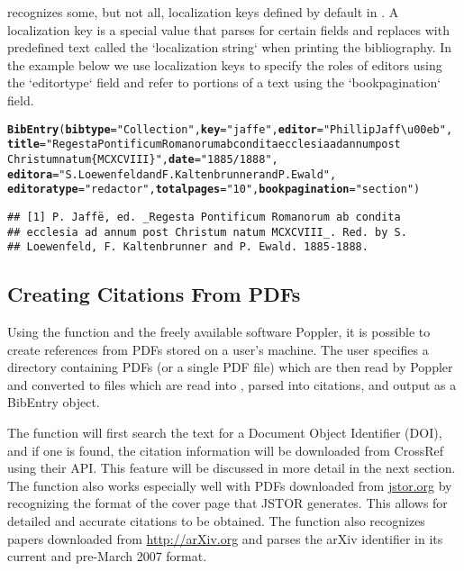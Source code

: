\documentclass[article]{jss}\usepackage[]{graphicx}\usepackage[]{color}
\makeatletter
\newcommand{\hlstr}[1]{\textcolor[rgb]{0.125,0.125,1}{#1}}%
\newcommand{\hlstd}[1]{\textcolor[rgb]{0.251,0.251,0.282}{#1}}%
\newcommand{\hlkwc}[1]{\textcolor[rgb]{0.529,0,0.184}{\textbf{#1}}}%
\newcommand{\hlkwd}[1]{\textcolor[rgb]{0.251,0.251,0.282}{\textbf{#1}}}%
\newenvironment{kframe}{%
 \def\at@end@of@kframe{}%
 \ifinner\ifhmode%
  \def\at@end@of@kframe{\end{minipage}}%
  \begin{minipage}{\columnwidth}%
 \fi\fi%
 \def\FrameCommand##1{\hskip\@totalleftmargin \hskip-\fboxsep
 \colorbox{shadecolor}{##1}\hskip-\fboxsep
     \hskip-\linewidth \hskip-\@totalleftmargin \hskip\columnwidth}%
 \MakeFramed {\advance\hsize-\width
   \@totalleftmargin\z@ \linewidth\hsize
   \@setminipage}}%
 {\par\unskip\endMakeFramed%
 \at@end@of@kframe}
\newenvironment{knitrout}{}{} %
\newcommand{\ourpkg}{\pkg{RefManageR}}
\makeatother
\begin{document}
\ourpkg{} recognizes some, but not all, localization keys defined by default in \Biblatex{}.  A localization key is a special value that \Biblatex{} parses for certain fields and replaces with predefined text called the `localization string` when printing the bibliography.  In the example below we use localization keys to specify the roles of editors using the `editortype` field and refer to portions of a text using the `bookpagination` field.
\begin{knitrout}
\color{fgcolor}\begin{kframe}
\begin{alltt}
\hlkwd{BibEntry}\hlstd{(}\hlkwc{bibtype}\hlstd{=}\hlstr{"Collection"}\hlstd{,} \hlkwc{key} \hlstd{=} \hlstr{"jaffe"}\hlstd{,} \hlkwc{editor} \hlstd{=} \hlstr{"Phillip Jaff\textbackslash{}u00eb"}\hlstd{,}
  \hlkwc{title} \hlstd{=} \hlstr{"Regesta Pontificum Romanorum ab condita ecclesia ad annum post
  Christum natum \{MCXCVIII\}"}\hlstd{,} \hlkwc{date} \hlstd{=} \hlstr{"1885/1888"}\hlstd{,}
  \hlkwc{editora} \hlstd{=} \hlstr{"S. Loewenfeld and F. Kaltenbrunner and P. Ewald"}\hlstd{,}
  \hlkwc{editoratype} \hlstd{=} \hlstr{"redactor"}\hlstd{,} \hlkwc{totalpages} \hlstd{=} \hlstr{"10"}\hlstd{,} \hlkwc{bookpagination} \hlstd{=} \hlstr{"section"}\hlstd{)}
\end{alltt}
\begin{verbatim}
## [1] P. Jaffë, ed. _Regesta Pontificum Romanorum ab condita
## ecclesia ad annum post Christum natum MCXCVIII_. Red. by S.
## Loewenfeld, F. Kaltenbrunner and P. Ewald. 1885-1888.
\end{verbatim}
\end{kframe}
\end{knitrout}

\subsection{Creating Citations From PDFs}
Using the function  and the freely available software Poppler, it is possible to create references from PDFs stored on a user's machine.  The user specifies a directory containing PDFs (or a single PDF file) which are then read by Poppler and converted to  files which are read into \R{}, parsed into citations, and output as a BibEntry object.  

The function will first search the text for a Document Object Identifier (DOI), and if one is found, the citation information will be downloaded from CrossRef using their API.  This feature will be discussed in more detail in the next section.  The function also works especially well with PDFs downloaded from \url{jstor.org} by recognizing the format of the cover page that JSTOR generates.  This allows for detailed and accurate citations to be obtained.  The function also recognizes papers downloaded from \url{http://arXiv.org} and parses the arXiv identifier in its current and pre-March 2007 format.
\end{document}
